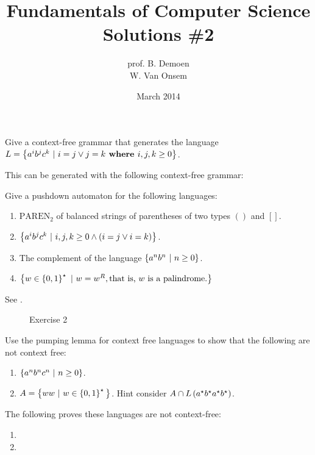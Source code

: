 \documentclass{article}
\title{Fundamentals of Computer Science\\Solutions \#2}
\author{prof. B. Demoen\\W. Van Onsem}
\date{March 2014}
\begin{document}
\maketitle
\begin{exercise}
Give a context-free grammar that generates the language $L=\left\{ a^ib^jc^k\ |\ i=j\vee j=k \mbox{\bf{ where }} i,j,k\geq0 \right\}$.
\begin{answer}This can be generated with the following context-free grammar:
\end{answer}
\end{exercise}

\begin{exercise}
Give a pushdown automaton for the following languages:
\begin{enumerate}
 \item $\mbox{PAREN}_2$ of balanced strings of parentheses of two types $()$ and $[]$.
 \item $\left\{ a^ib^jc^k\ |\ i,j,k\geq0\wedge \left( i=j\vee i=k \right) \right\}$.
 \item The complement of the language $\left\{ a^nb^n\ |\ n\geq 0 \right\}$.
 \item $\left\{ w\in\left\{ 0,1 \right\}^{\star}\ |\ w=w^R, \mbox{that is, $w$ is a palindrome.} \right\}$
\end{enumerate}
\begin{answer}
See .
\begin{figure}[hbt]
\centering
{}
\caption{Exercise 2}
\end{figure}
\end{answer}
\end{exercise}

\begin{exercise}
Use the pumping lemma for context free languages to show that the following are not context free:
\begin{enumerate}
 \item $\left\{ a^nb^nc^n\ |\ n\geq0 \right\}$.
 \item $A=\left\{ ww\ |\ w\in\left\{ 0,1 \right\}^\star{} \right\}$. Hint consider $A\cap L\left( a^{\star}b^{\star}a^{\star}b^{\star} \right)$.
\end{enumerate}
\begin{answer}
The following proves these languages are not context-free:
\begin{enumerate}
 \item 
 \item 
\end{enumerate}
\end{answer}
\end{exercise}
\end{document}
